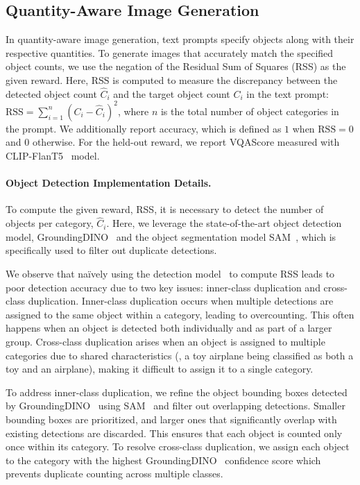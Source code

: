 \subsection{Quantity-Aware Image Generation}
In quantity-aware image generation, text prompts specify objects along with their respective quantities. To generate images that accurately match the specified object counts, we use the negation of the Residual Sum of Squares (RSS) as the given reward. 
Here, RSS is computed to measure the discrepancy between the detected object count $\hat{C}_i$ and the target object count $C_i$ in the text prompt: $\text{RSS} = \sum_{i=1}^{n} \left( C_i - \hat{C}_i \right)^2$,
where $n$ is the total number of object categories in the prompt. 
We additionally report accuracy, which is defined as $1$ when $\text{RSS} = 0$ and $0$ otherwise. 
For the held-out reward, we report VQAScore measured with CLIP-FlanT5~\cite{Lin:2024CLIPFlanT5} model. 

\paragraph{Object Detection Implementation Details.} 
To compute the given reward, RSS, it is necessary to detect the number of objects per category, $\hat{C}_i$. Here, we leverage the state-of-the-art object detection model, GroundingDINO~\cite{Liu:2024GroundingDINO} and the object segmentation model SAM~\cite{Kirillov2023:SAM}, which is specifically used to filter out duplicate detections. 

We observe that na\"ively using the detection model~\cite{Liu:2024GroundingDINO} to compute RSS leads to poor detection accuracy due to two key issues: inner-class duplication and cross-class duplication.
Inner-class duplication occurs when multiple detections are assigned to the same object within a category, leading to overcounting. This often happens when an object is detected both individually and as part of a larger group.
Cross-class duplication arises when an object is assigned to multiple categories due to shared characteristics (\eg, a toy airplane being classified as both a toy and an airplane), making it difficult to assign it to a single category. 

To address inner-class duplication, we refine the object bounding boxes detected by GroundingDINO~\cite{Liu:2024GroundingDINO} using SAM~\cite{Kirillov2023:SAM} and filter out overlapping detections. Smaller bounding boxes are prioritized, and larger ones that significantly overlap with existing detections are discarded. This ensures that each object is counted only once within its category.
To resolve cross-class duplication, we assign each object to the category with the highest GroundingDINO~\cite{Liu:2024GroundingDINO} confidence score which prevents duplicate counting across multiple classes. 

